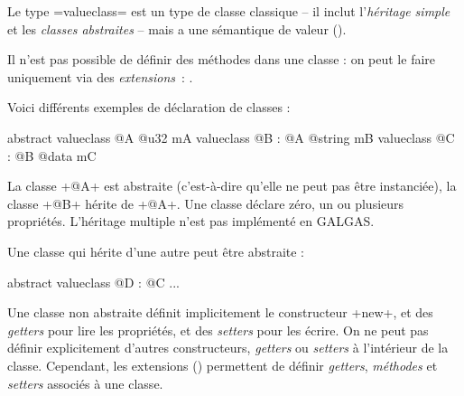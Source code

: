 




Le type \ggsq=valueclass= est un type de classe classique -- il inclut l'\emph{héritage simple} et les \emph{classes abstraites} -- mais a une sémantique de valeur ().

Il n'est pas possible de définir des méthodes dans une classe : on peut le faire uniquement via des \emph{extensions}~: .










Voici différents exemples de déclaration de classes :

\begin{galgas4}
abstract valueclass @A {
  @u32 mA
}
valueclass @B : @A {
  @string mB
}
valueclass @C : @B {
  @data mC
}
\end{galgas4}

La classe \ggsq+@A+ est abstraite (c'est-à-dire qu'elle ne peut pas être instanciée), la classe \ggsq+@B+ hérite de \ggsq+@A+. Une classe déclare zéro, un ou plusieurs propriétés. L'héritage multiple n'est pas implémenté en GALGAS.

Une classe qui hérite d'une autre peut être abstraite :
\begin{galgas4}
abstract valueclass @D : @C {
  ...
 }
\end{galgas4}

Une classe non abstraite définit implicitement le constructeur \ggsq+new+, et des \emph{getters} pour lire les propriétés, et des \emph{setters} pour les écrire. On ne peut pas définir explicitement d'autres constructeurs, \emph{getters} ou \emph{setters} à l'intérieur de la classe. Cependant,  les extensions () permettent de définir \emph{getters}, \emph{méthodes} et \emph{setters} associés à une classe.











